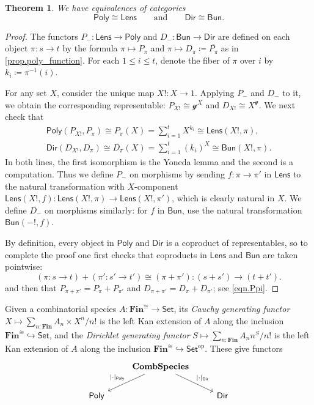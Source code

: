 \documentclass[11pt, article, one side]{memoir}
\theoremstyle{theorem}
\newtheorem{theorem}[equation]{Theorem}
\theoremstyle{definition}
\theoremstyle{remark}
\newcommand{\Cat}[1]{\mathsf{#1}}%
\newcommand{\inv}{^{-1}}
\newcommand{\smset}{\Cat{Set}}
\newcommand{\lens}{\Cat{Lens}}
\newcommand{\bun}{\Cat{Bun}}
\newcommand{\yon}{\mathcal{y}}
\newcommand{\poly}{\Cat{Poly}}
\newcommand{\dir}{\Cat{Dir}}
\newcommand{\qqand}{\qquad\text{and}\qquad}
\begin{document}
\begin{theorem}
We have equivalences of categories
\[
\poly\cong\lens
\qqand
\dir\cong\bun.
\]
\end{theorem}
\begin{proof}
The functors $P_-\colon\lens\to\poly$ and $D_-\colon\bun\to\dir$ are defined on each object $\pi\colon s\to t$ by the formula $\pi\mapsto P_\pi$ and $\pi\mapsto D_\pi\coloneqq\overline{P_\pi}$ as in \cref{prop.poly_function}. For each $1\leq i\leq t$, denote the fiber of $\pi$ over $i$ by $k_i\coloneqq\pi\inv(i)$.

For any set $X$, consider the unique map $X!\colon X\to 1$. Applying $P_-$ and $D_-$ to it, we obtain the corresponding representable: $P_{X!}\cong\yon^X$ and $D_{X!}\cong X^\yon$. We next check that
 \begin{gather*}
  \poly(P_{X!},P_\pi)\cong 
  P_\pi(X)=
  \sum_{i=1}^{t}X^{k_i}\cong
  \lens(X!, \pi),
  \\
  \dir(D_{X!}, D_\pi)\cong 
  D_\pi(X)=
  \sum_{i=1}^{t}(k_i)^X\cong
  \bun(X!, \pi).
\end{gather*}
In both lines, the first isomorphism is the Yoneda lemma and the second is a computation. Thus we define $P_-$ on morphisms by sending $f\colon\pi\to\pi'$ in $\lens$ to the natural transformation with $X$-component $\lens(X!,f)\colon\lens(X!,\pi)\to\lens(X!,\pi')$, which is clearly natural in $X$. We define $D_-$ on morphisms similarly: for $f$ in $\bun$, use the natural transformation $\bun(-!,f)$.

By definition, every object in $\poly$ and $\dir$ is a coproduct of representables, so to complete the proof one first checks that coproducts in $\lens$ and $\bun$ are taken pointwise:
\[
(\pi\colon s\to t)+(\pi'\colon s'\to t')\cong(\pi+\pi')\colon (s+s')\to (t+t').
\]
and then that $P_{\pi+\pi'}=P_\pi+P_{\pi'}$ and $D_{\pi+\pi'}=D_\pi+D_{\pi'}$; see \cref{eqn.Ppi}.
\end{proof}

Given a combinatorial species $A : \textbf{Fin}^{\cong} \to \smset$, its
\emph{Cauchy generating functor} $X \mapsto \sum_{n : \textbf{Fin}} A_n \times X^n/n!$
is the left Kan extension of $A$ along the inclusion $\textbf{Fin}^{\cong}
\hookrightarrow \smset$, and the \emph{Dirichlet generating functor} $S \mapsto
\sum_{n : \textbf{Fin}} A_n n^S/n!$ is the left Kan extension of $A$ along the
inclusion $\textbf{Fin}^{\cong} \hookrightarrow \smset^{\text{op}}$. These give
functors
\[
  \begin{tikzcd}
    & \textbf{CombSpecies} \arrow[dr, "|\cdot|_{\dir}"] \arrow[dl, "|\cdot|_{\poly}"']& \\
    \poly & & \dir
  \end{tikzcd}
\]
\end{document}

